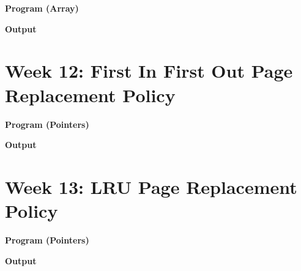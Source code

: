 \documentclass{article}
\begin{document}
\newpage
\noindent \textbf{\large{Program (Array)}}


\newpage
\noindent \textbf{\large{Output}}


\newpage
\section{Week 12: First In First Out Page Replacement Policy}

\noindent \textbf{\large{Program (Pointers)}}


\newpage
\noindent \textbf{\large{Output}}


\newpage
\section{Week 13: LRU Page Replacement Policy}

\noindent \textbf{\large{Program (Pointers)}}


\newpage
\noindent \textbf{\large{Output}}

\end{document}
